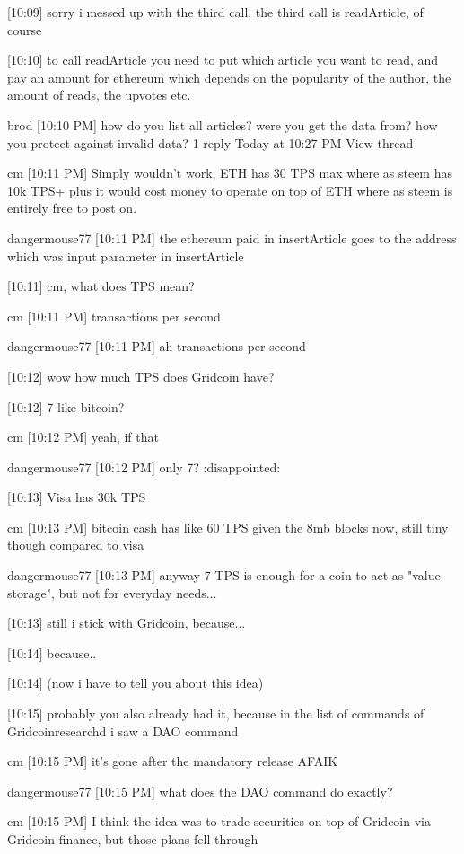 {[10:09] 
sorry i messed up with the third call, the third call is readArticle, of course


[10:10] 
to call readArticle you need to put which article you want to read, and pay an amount for ethereum which depends on the popularity of the author, the amount of reads, the upvotes etc.


brod 
[10:10 PM] 
how do you list all articles? were you get the data from? how you protect against invalid data?
1 reply Today at 10:27 PM View thread


cm 
[10:11 PM] 
Simply wouldn't work, ETH has 30 TPS max where as steem has 10k TPS+ plus it would cost money to operate on top of ETH where as steem is entirely free to post on.


dangermouse77 [10:11 PM] 
the ethereum paid in insertArticle goes to the address which was input parameter in insertArticle


[10:11] 
cm, what does TPS mean?


cm 
[10:11 PM] 
transactions per second


dangermouse77 [10:11 PM] 
ah transactions per second


[10:12] 
wow how much TPS does Gridcoin have?


[10:12] 
7 like bitcoin?


cm 
[10:12 PM] 
yeah, if that


dangermouse77 [10:12 PM] 
only 7? :disappointed:


[10:13] 
Visa has 30k TPS


cm 
[10:13 PM] 
bitcoin cash has like 60 TPS given the 8mb blocks now, still tiny though compared to visa


dangermouse77 [10:13 PM] 
anyway 7 TPS is enough for a coin to act as "value storage", but not for everyday needs...


[10:13] 
still i stick with Gridcoin, because...


[10:14] 
because..


[10:14] 
(now i have to tell you about this idea)


[10:15] 
probably you also already had it, because in the list of commands of Gridcoinresearchd i saw a DAO command


cm 
[10:15 PM] 
it's gone after the mandatory release AFAIK


dangermouse77 [10:15 PM] 
what does the DAO command do exactly?


cm 
[10:15 PM] 
I think the idea was to trade securities on top of Gridcoin via Gridcoin finance, but those plans fell through


}
